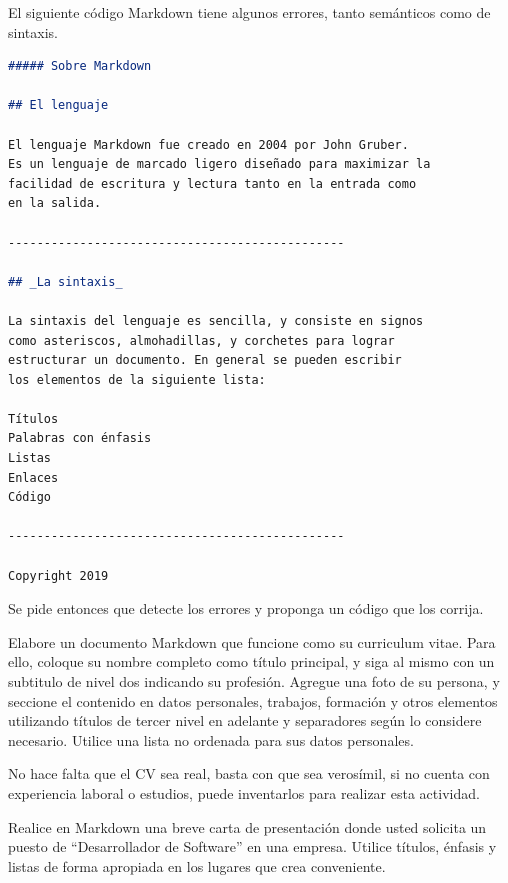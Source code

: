 \begin{exercise}
El siguiente código Markdown tiene algunos errores, tanto semánticos como de
sintaxis.

\begin{minipage}{0.92\textwidth}
\begin{lstlisting}[language=Markdown]
##### Sobre Markdown

## El lenguaje

El lenguaje Markdown fue creado en 2004 por John Gruber.
Es un lenguaje de marcado ligero diseñado para maximizar la
facilidad de escritura y lectura tanto en la entrada como
en la salida.

-----------------------------------------------

## _La sintaxis_

La sintaxis del lenguaje es sencilla, y consiste en signos
como asteriscos, almohadillas, y corchetes para lograr
estructurar un documento. En general se pueden escribir
los elementos de la siguiente lista:

Títulos
Palabras con énfasis
Listas
Enlaces
Código

-----------------------------------------------

Copyright 2019
\end{lstlisting}
\end{minipage}

Se pide entonces que detecte los errores y proponga un código que los corrija.
\end{exercise}

\begin{exercise}
Elabore un documento Markdown que funcione como su curriculum vitae.
Para ello, coloque su nombre completo como título principal, y siga al mismo
con un subtitulo de nivel dos indicando su profesión. Agregue una foto de su persona,
y seccione el contenido en datos personales, trabajos, formación y otros elementos
utilizando títulos de tercer nivel en adelante y separadores según lo considere
necesario. Utilice una lista no ordenada para sus datos personales.

No hace falta que el CV sea real, basta con que sea verosímil, si no cuenta con
experiencia laboral o estudios, puede inventarlos para realizar esta actividad.
\end{exercise}

\begin{exercise}
Realice en Markdown una breve carta de presentación donde usted solicita
un puesto de ``Desarrollador de Software'' en una empresa. Utilice títulos,
énfasis y listas de forma apropiada en los lugares que crea conveniente.
\end{exercise}
